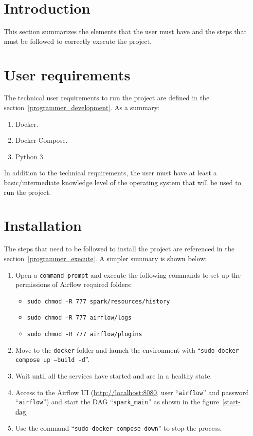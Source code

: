
\section{Introduction}
\nonzeroparskip This section summarizes the elements that the user must have and the steps that must be followed to correctly execute the project.

\section{User requirements}
\nonzeroparskip The technical user requirements to run the project are defined in the section~\ref{programmer_development}. As a summary:
\begin{enumerate}
	\item Docker.
	\item Docker Compose.
	\item Python 3.
\end{enumerate}

\nonzeroparskip In addition to the technical requirements, the user must have at least a basic/intermediate knowledge level of the operating system that will be used to run the project.


\section{Installation}
\nonzeroparskip The steps that need to be followed to install the project are referenced in the section~\ref{programmer_execute}. A simpler summary is shown below:
\begin{enumerate}
	\item Open a \texttt{command prompt} and execute the following commands to set up the permissions of Airflow required folders:
	\begin{itemize}
		\item \texttt{sudo chmod -R 777 spark/resources/history}
		\item \texttt{sudo chmod -R 777 airflow/logs}
		\item \texttt{sudo chmod -R 777 airflow/plugins}
	\end{itemize}
	\item Move to the \texttt{docker} folder and launch the environment with ``\texttt{sudo docker-compose up --build -d}''.
	\item Wait until all the services have started and are in a healthy state.
	\item Access to the Airflow UI (\url{http://localhost:8080}, user ``\texttt{airflow}'' and password ``\texttt{airflow}'') and start the DAG ``\texttt{spark\_main}'' as shown in the figure~\ref{start-dag}.
	\item Use the command ``\texttt{sudo docker-compose down}'' to stop the process.
\end{enumerate}

